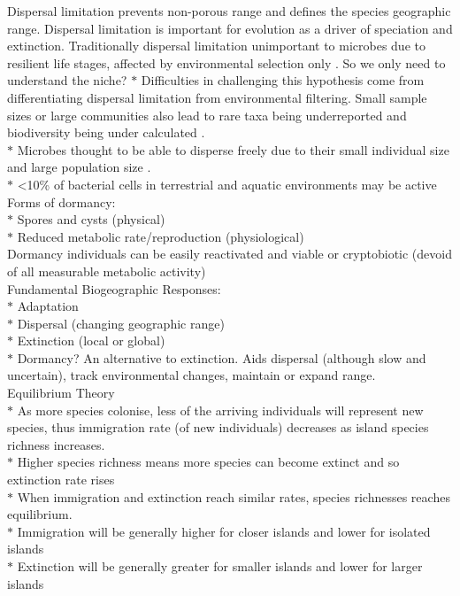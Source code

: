 \noindent Dispersal limitation prevents non-porous range and defines the species geographic range. Dispersal limitation is important for evolution as a driver of speciation and extinction. Traditionally dispersal limitation unimportant to microbes due to resilient life stages, affected by environmental selection only \cite{baas1934geobiologie}. So we only need to understand the niche?  
{$\ast$ Difficulties in challenging this hypothesis come from differentiating dispersal limitation from environmental filtering. Small sample sizes or large communities also lead to rare taxa being underreported and biodiversity being under calculated \cite{woodcock2006taxa}. }\\
{$\ast$ Microbes thought to be able to disperse freely due to their small individual size and large population size \cite{fenchel2004ubiquity}.}\\
{$\ast$ <10\% of bacterial cells in terrestrial and aquatic environments may be active }\\

\noindent Forms of dormancy:\\
{$\ast$ Spores and cysts (physical)}\\
{$\ast$ Reduced metabolic rate/reproduction (physiological)}\\

\noindent Dormancy individuals can be easily reactivated and viable or cryptobiotic (devoid of all measurable metabolic activity) \\

\noindent Fundamental Biogeographic Responses:\\
{$\ast$ Adaptation}\\
{$\ast$ Dispersal (changing geographic range)}\\
{$\ast$ Extinction (local or global)}\\
{$\ast$ Dormancy? An alternative to extinction. Aids dispersal (although slow and uncertain), track environmental changes, maintain or expand range. }\\

\noindent Equilibrium Theory\\
{$\ast$ As more species colonise, less of the arriving individuals will represent new species, thus immigration rate (of new individuals) decreases as island species richness increases.}\\
{$\ast$ Higher species richness means more species can become extinct and so extinction rate rises}\\
{$\ast$ When immigration and extinction reach similar rates, species richnesses reaches equilibrium.}\\
{$\ast$ Immigration will be generally higher for closer islands and lower for isolated islands}\\
{$\ast$ Extinction will be generally greater for smaller islands and lower for larger islands}\\

